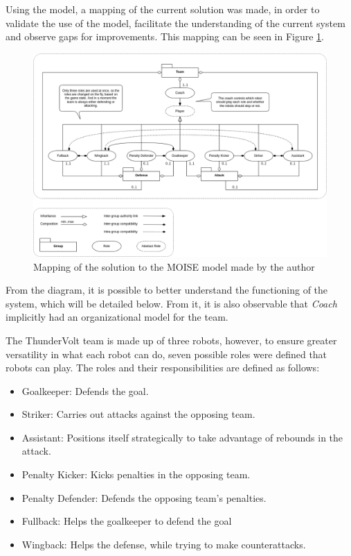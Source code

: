 Using the \MOISEp \cite{MOISEp} model, a mapping of the current solution was made, in order to validate the use of the model, facilitate the understanding of the current system and observe gaps for improvements. This mapping can be seen in Figure \ref{fig:moise_mapping}.

\begin{figure}[!ht]
    \centering
    \includegraphics[width=\linewidth]{images/ThunderVolt Moise-Structural Specification.png}
    \caption{Mapping of the solution to the MOISE model made by the author}
    \label{fig:moise_mapping}
\end{figure}

From the diagram, it is possible to better understand the functioning of the system, which will be detailed below. From it, it is also observable that \textit{Coach} implicitly had an organizational model for the team.

The ThunderVolt team is made up of three robots, however, to ensure greater versatility in what each robot can do, seven possible roles were defined that robots can play. The roles and their responsibilities are defined as follows:

\begin{itemize}
    \item Goalkeeper: Defends the goal.
    \item Striker: Carries out attacks against the opposing team.
    \item Assistant: Positions itself strategically to take advantage of rebounds in the attack.
    \item Penalty Kicker: Kicks penalties in the opposing team.
    \item Penalty Defender: Defends the opposing team's penalties.
    \item Fullback: Helps the goalkeeper to defend the goal
    \item Wingback: Helps the defense, while trying to make counterattacks.
\end{itemize}

